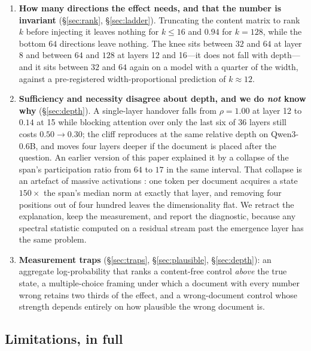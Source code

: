 \documentclass{article}
\begin{document}
\begin{enumerate}
the instance's own $1.00$, and the instance-specific remainder recovers exactly
nothing.
\item \textbf{How many directions the effect needs, and that the number is
invariant} (\S\ref{sec:rank}, \S\ref{sec:ladder}). Truncating the content
matrix to rank $k$ before injecting it leaves nothing for $k\le16$ and $0.94$
for $k=128$, while the bottom $64$ directions leave nothing. The knee sits
between $32$ and $64$ at layer 8 and between $64$ and $128$ at layers 12 and
16---it does not fall with depth---and it sits between $32$ and $64$ again on a
model with a quarter of the width, against a pre-registered width-proportional
prediction of $k\approx12$.
\item \textbf{Sufficiency and necessity disagree about depth, and we do
\emph{not} know why} (\S\ref{sec:depth}). A single-layer handover falls from
$\rho = 1.00$ at layer 12 to $0.14$ at 15 while blocking attention over only the
last six of 36 layers still costs $0.50 \to 0.30$; the cliff reproduces at the
same relative depth on Qwen3-0.6B, and moves four layers deeper if the document
is placed after the question. An earlier version of this paper explained it by a
collapse of the span's participation ratio from $64$ to $17$ in the same
interval. That collapse is an artefact of massive activations
\citep{sun2024massive}: one token per document acquires a state $150\times$ the
span's median norm at exactly that layer, and removing four positions out of
four hundred leaves the dimensionality flat. We retract the explanation, keep
the measurement, and report the diagnostic, because any spectral statistic
computed on a residual stream past the emergence layer has the same problem.
\item \textbf{Measurement traps} (\S\ref{sec:traps},
\S\ref{sec:plausible}, \S\ref{sec:depth}): an aggregate log-probability that ranks a content-free
control \emph{above} the true state, a multiple-choice framing under which a
document with every number wrong retains two thirds of the effect, and a
wrong-document control whose strength depends entirely on how plausible the
wrong document is.
\end{enumerate}




\subsection{Limitations, in full}
\label{app:limits}
\end{document}
